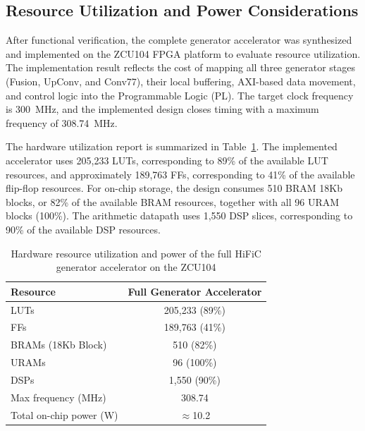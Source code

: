 
\subsection{Resource Utilization and Power Considerations}

After functional verification, the complete generator accelerator was synthesized and implemented on the ZCU104 FPGA platform to evaluate resource utilization. The implementation result reflects the cost of mapping all three generator stages (Fusion, UpConv, and Conv77), their local buffering, AXI-based data movement, and control logic into the Programmable Logic (PL). The target clock frequency is 300~MHz, and the implemented design closes timing with a maximum frequency of 308.74~MHz.

The hardware utilization report is summarized in Table~\ref{tab:hific_generator_utilization}. The implemented accelerator uses 205,233 LUTs, corresponding to 89\% of the available LUT resources, and approximately 189,763 FFs, corresponding to 41\% of the available flip-flop resources. For on-chip storage, the design consumes 510 BRAM 18Kb blocks, or 82\% of the available BRAM resources, together with all 96 URAM blocks (100\%). The arithmetic datapath uses 1,550 DSP slices, corresponding to 90\% of the available DSP resources.

\begin{table}[H]
    \centering
    \caption{Hardware resource utilization and power of the full HiFiC generator accelerator on the ZCU104}
    \label{tab:hific_generator_utilization}
    \begin{tabular}{|l|c|}
        \hline
        \textbf{Resource} & \textbf{Full Generator Accelerator} \\
        \hline
        LUTs & 205,233 (89\%) \\
        \hline
        FFs & 189,763 (41\%) \\
        \hline
        BRAMs (18Kb Block) & 510 (82\%) \\
        \hline
        URAMs & 96 (100\%) \\
        \hline
        DSPs & 1,550 (90\%) \\
        \hline
        Max frequency (MHz) & 308.74 \\
        \hline
        Total on-chip power (W) & $\approx$10.2 \\
        \hline
    \end{tabular}
\end{table}

